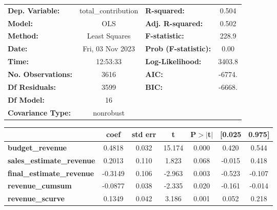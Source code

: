 \begin{center}
\begin{tabular}{lclc}
\toprule
\textbf{Dep. Variable:}                & total\_contribution & \textbf{  R-squared:         } &     0.504   \\
\textbf{Model:}                        &         OLS         & \textbf{  Adj. R-squared:    } &     0.502   \\
\textbf{Method:}                       &    Least Squares    & \textbf{  F-statistic:       } &     228.9   \\
\textbf{Date:}                         &   Fri, 03 Nov 2023  & \textbf{  Prob (F-statistic):} &     0.00    \\
\textbf{Time:}                         &       12:53:33      & \textbf{  Log-Likelihood:    } &    3403.8   \\
\textbf{No. Observations:}             &          3616       & \textbf{  AIC:               } &    -6774.   \\
\textbf{Df Residuals:}                 &          3599       & \textbf{  BIC:               } &    -6668.   \\
\textbf{Df Model:}                     &            16       & \textbf{                     } &             \\
\textbf{Covariance Type:}              &      nonrobust      & \textbf{                     } &             \\
\bottomrule
\end{tabular}
\begin{tabular}{lcccccc}
                                       & \textbf{coef} & \textbf{std err} & \textbf{t} & \textbf{P$> |$t$|$} & \textbf{[0.025} & \textbf{0.975]}  \\
\midrule
\textbf{budget\_revenue}               &       0.4818  &        0.032     &    15.174  &         0.000        &        0.420    &        0.544     \\
\textbf{sales\_estimate\_revenue}      &       0.2013  &        0.110     &     1.823  &         0.068        &       -0.015    &        0.418     \\
\textbf{final\_estimate\_revenue}      &      -0.3149  &        0.106     &    -2.963  &         0.003        &       -0.523    &       -0.107     \\
\textbf{revenue\_cumsum}               &      -0.0877  &        0.038     &    -2.335  &         0.020        &       -0.161    &       -0.014     \\
\textbf{revenue\_scurve}               &       0.1349  &        0.042     &     3.186  &         0.001        &        0.052    &        0.218     \\

\end{tabular}
\end{center}

